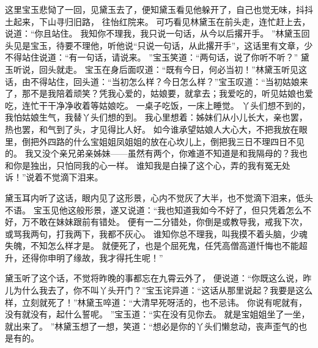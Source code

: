 这里宝玉悲恸了一回，见黛玉去了，便知黛玉看见他躲开了，自己也觉无味，抖抖土起来，下山寻归旧路，
往怡红院来。
可巧看见林黛玉在前头走，连忙赶上去，说道：“你且站住。
我知你不理我，我只说一句话，从今以后撂开手。
”林黛玉回头见是宝玉，待要不理他，听他说“只说一句话，从此撂开手”，这话里有文章，少不得站住说道：“有一句话，请说来。
”宝玉笑道：“两句话，说了你听不听？” 
黛玉听说，回头就走。
宝玉在身后面叹道：“既有今日，何必当初！”林黛玉听见这话，由不得站住，回头道：“当初怎么样？今日怎么样？”宝玉叹道：“当初姑娘来了，那不是我陪着顽笑？凭我心爱的，姑娘要，就拿去；我爱吃的，听见姑娘也爱吃，连忙干干净净收着等姑娘吃。
一桌子吃饭，一床上睡觉。
丫头们想不到的，我怕姑娘生气，我替丫头们想的到。
我心里想着：姊妹们从小儿长大，亲也罢，热也罢，和气到了头，才见得比人好。
如今谁承望姑娘人大心大，不把我放在眼里，倒把外四路的什么宝姐姐凤姐姐的放在心坎儿上，倒把我三日不理四日不见的。
我又没个亲兄弟亲姊妹——虽然有两个，你难道不知道是和我隔母的？我也和你是独出，只怕同我的心一样。
谁知我是白操了这个心，弄的我有冤无处诉！”说着不觉滴下泪来。
\par
黛玉耳内听了这话，眼内见了这形景，心内不觉灰了大半，也不觉滴下泪来，低头不语。
宝玉见他这般形景，遂又说道：“我也知道我如今不好了，但只凭着怎么不好，万不敢在妹妹跟前有错处。
便有一二分错处，你倒是或教导我，戒我下次，或骂我两句，打我两下，我都不灰心。
谁知你总不理我，叫我摸不着头脑，少魂失魄，不知怎么样才是。
就便死了，也是个屈死鬼，任凭高僧高道忏悔也不能超升，还得你申明了缘故，我才得托生呢！”\par
黛玉听了这个话，不觉将昨晚的事都忘在九霄云外了， 便说道：“你既这么说，昨儿为什么我去了，你不叫丫头开门？”宝玉诧异道：“这话从那里说起？我要是这么样，立刻就死了！”林黛玉啐道：“大清早死呀活的，也不忌讳。
你说有呢就有，没有就没有，起什么誓呢。
”宝玉道：“实在没有见你去。
就是宝姐姐坐了一坐，就出来了。
”林黛玉想了一想，笑道：“想必是你的丫头们懒怠动，丧声歪气的也是有的。
